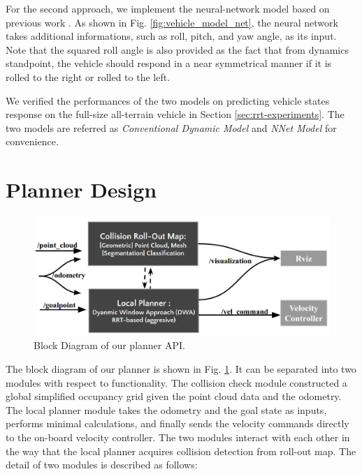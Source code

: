 \documentclass[../thesis.tex]{subfiles}
\begin{document}
For the second approach, we implement the neural-network model based on previous work \cite{bode2007learning}. As shown in Fig. \ref{fig:vehicle_model_net}, the neural network takes additional informations, such as roll, pitch, and yaw angle, as its input. Note that the squared roll angle is also provided as the fact that from dynamics standpoint, the vehicle should respond in a near symmetrical manner if it is rolled to the right or rolled to the left. 

We verified the performances of the two models on predicting vehicle states response on the full-size all-terrain vehicle in Section \ref{sec:rrt-experiments}. The two models are referred as \textit{Conventional Dynamic Model} and \textit{NNet Model} for convenience. 


\section{Planner Design} \label{sec:rrt-planner}


\begin{figure}[t]
	\begin{center}
		\centerline{\includegraphics[width=0.8\columnwidth]{./RRTPlanner/fig/planner_module.png}}
		\caption{Block Diagram of our planner API.}
		\label{fig:planner_module}
	\end{center}
\end{figure} 

The block diagram of our planner is shown in Fig. \ref{fig:planner_module}. It can be separated into two modules with respect to functionality. The collision check module constructed a global simplified occupancy grid given the point cloud data and the odometry. The local planner module takes the odometry and the goal state as inputs, performs minimal calculations, and finally sends the velocity commands directly to the on-board velocity controller.
The two modules interact with each other in the way that the local planner acquires collision detection from roll-out map.
The detail of two modules is described as follows:
\end{document}
